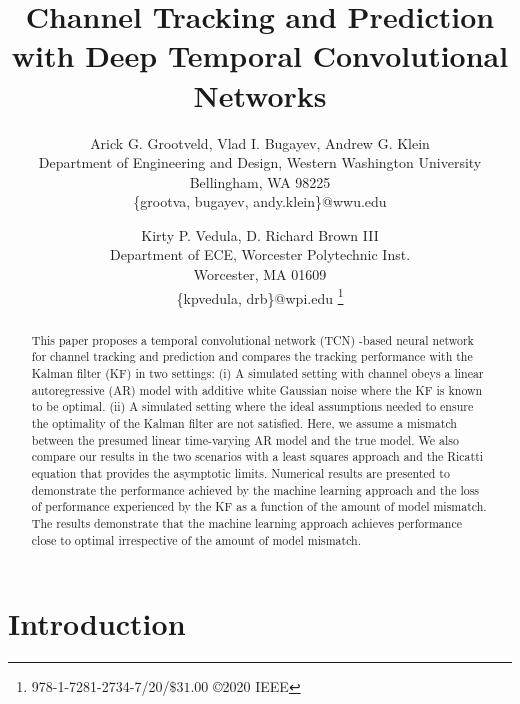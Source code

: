 \documentclass[twocolumn,letterpaper]{IEEEAerospaceCLS}  %
\begin{document}
\title{Channel Tracking and Prediction with Deep Temporal Convolutional Networks}

\author{%
Arick G. Grootveld, Vlad I. Bugayev, Andrew G. Klein\\
Department of Engineering and Design, Western Washington University\\
Bellingham, WA 98225\\
\{grootva, bugayev, andy.klein\}@wwu.edu
\and
Kirty P. Vedula, D. Richard Brown III\\
Department of ECE, Worcester Polytechnic Inst.\\
Worcester, MA 01609\\
\{kpvedula, drb\}@wpi.edu
\thanks{\footnotesize 978-1-7281-2734-7/20/$\$31.00$ \copyright2020 IEEE}              %
}

\maketitle

\thispagestyle{plain}
\pagestyle{plain}

\begin{abstract}
This paper proposes a temporal convolutional network (TCN) -based neural network for channel tracking and prediction and compares the tracking performance with the Kalman filter (KF) in two settings: (i)	A simulated setting with channel obeys a linear autoregressive (AR) model with additive white Gaussian noise where the KF is known to be optimal.
(ii)	A simulated setting where the ideal assumptions needed to ensure the optimality of the Kalman filter are not satisfied. Here, we assume a mismatch between the presumed linear time-varying AR model and the true model. We also compare our results in the two scenarios with a least squares approach and the Ricatti equation that provides the asymptotic limits. Numerical results are presented to demonstrate the performance achieved by the machine learning approach and the loss of performance experienced by the KF as a function of the amount of model mismatch. The results demonstrate that the machine learning approach achieves performance close to optimal irrespective of the amount of model mismatch.
\end{abstract}

\tableofcontents
\section{Introduction}
\label{sec:intro}
\end{document}
